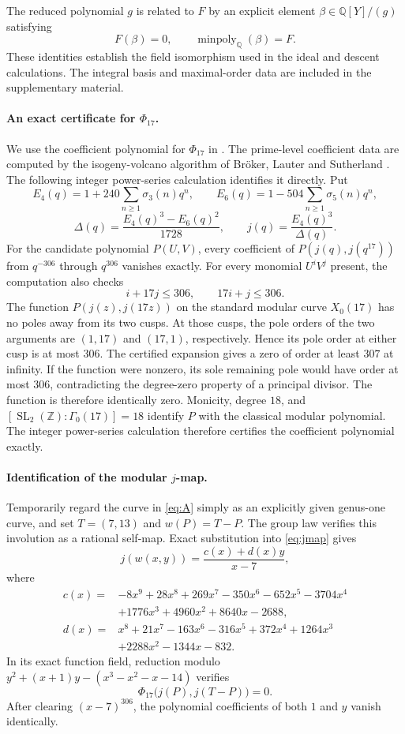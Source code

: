 \documentclass[11pt,a4paper]{article}
\theoremstyle{definition}\newtheorem{definition}[theorem]{Definition}
\theoremstyle{remark}\newtheorem{remark}[theorem]{Remark}
\newcommand{\Q}{\mathbb Q}\newcommand{\Z}{\mathbb Z}\newcommand{\F}{\mathbb F}
\begin{document}
The reduced polynomial $g$ is related to $F$ by an explicit element $\beta\in\Q[Y]/(g)$ satisfying
\[
F(\beta)=0,\qquad \operatorname{minpoly}_{\Q}(\beta)=F.
\]
These identities establish the field isomorphism used in the ideal and descent calculations. The integral basis and maximal-order data are included in the supplementary material.

\paragraph{An exact certificate for $\Phi_{17}$.}
We use the coefficient polynomial for $\Phi_{17}$ in \cite{Sutherland}. The prime-level coefficient data are computed by the isogeny-volcano algorithm of Br\"oker, Lauter and Sutherland \cite{BLS}. The following integer power-series calculation identifies it directly. Put
\[
E_4(q)=1+240\sum_{n\geq1}\sigma_3(n)q^n,\qquad
E_6(q)=1-504\sum_{n\geq1}\sigma_5(n)q^n,
\]
\[
\Delta(q)=\frac{E_4(q)^3-E_6(q)^2}{1728},\qquad
j(q)=\frac{E_4(q)^3}{\Delta(q)}.
\]
For the candidate polynomial $P(U,V)$, every coefficient of
$P(j(q),j(q^{17}))$ from $q^{-306}$ through $q^{306}$ vanishes exactly.
For every monomial $U^iV^j$ present, the computation also checks
\[
i+17j\leq306,\qquad 17i+j\leq306.
\]
The function $P(j(z),j(17z))$ on the standard modular curve $X_0(17)$
has no poles away from its two cusps. At those cusps, the pole orders
of the two arguments are $(1,17)$ and $(17,1)$, respectively. Hence its
pole order at either cusp is at most $306$. The certified expansion
gives a zero of order at least $307$ at infinity. If the function were
nonzero, its sole remaining pole would have order at most $306$,
contradicting the degree-zero property of a principal divisor. The
function is therefore identically zero. Monicity, degree $18$, and
$[\operatorname{SL}_2(\Z):\Gamma_0(17)]=18$ identify $P$ with the
classical modular polynomial. The integer power-series calculation therefore certifies the coefficient polynomial exactly.

\paragraph{Identification of the modular $j$-map.}
Temporarily regard the curve in \eqref{eq:A} simply as an explicitly
given genus-one curve, and set $T=(7,13)$ and $w(P)=T-P$.
The group law verifies this involution as a rational self-map. Exact
substitution into \eqref{eq:jmap} gives
\[
j(w(x,y))=\frac{c(x)+d(x)y}{x-7},
\]
where
\begin{align*}
c(x)={}&-8x^9+28x^8+269x^7-350x^6-652x^5-3704x^4\\
&+1776x^3+4960x^2+8640x-2688,\\
d(x)={}&x^8+21x^7-163x^6-316x^5+372x^4+1264x^3\\
&+2288x^2-1344x-832.
\end{align*}
In its exact function field, reduction modulo
$y^2+(x+1)y-(x^3-x^2-x-14)$ verifies
\begin{equation}\label{eq:fricke-modular-identity}
\Phi_{17}\bigl(j(P),j(T-P)\bigr)=0.
\end{equation}
After clearing $(x-7)^{306}$, the polynomial coefficients of both $1$ and $y$ vanish identically.
\end{document}
